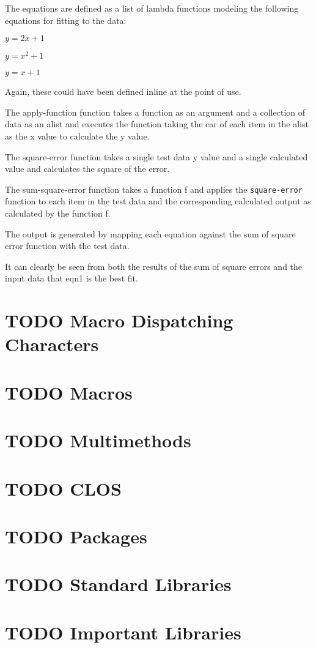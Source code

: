 \documentclass[11pt]{article}
\begin{document}
The equations are defined as a list of lambda functions modeling the
following equations for fitting to the data:

$y=2x+1$

$y=x^2+1$

$y=x+1$

Again, these could have been defined inline at the point of use. 

The apply-function function takes a function as an argument and a
collection of data as an alist and executes the function taking the
car of each item in the alist as the x value to calculate the y value.

The square-error function takes a single test data y value and a
single calculated value and calculates the square of the error.

The sum-square-error function takes a function f and applies the
\texttt{square-error} function to each item in the test data and the
corresponding calculated output as calculated by the function f.

The output is generated by mapping each equation against the sum of
square error function with the test data.

It can clearly be seen from both the results of the sum of square
errors and the input data that eqn1 is the best fit.


\section{{\bfseries\sffamily TODO} Macro Dispatching Characters}
\label{sec-9}
\section{{\bfseries\sffamily TODO} Macros}
\label{sec-10}
\section{{\bfseries\sffamily TODO} Multimethods}
\label{sec-11}
\section{{\bfseries\sffamily TODO} CLOS}
\label{sec-12}
\section{{\bfseries\sffamily TODO} Packages}
\label{sec-13}
\section{{\bfseries\sffamily TODO} Standard Libraries}
\label{sec-14}
\section{{\bfseries\sffamily TODO} Important Libraries}
\label{sec-15}
\end{document}

